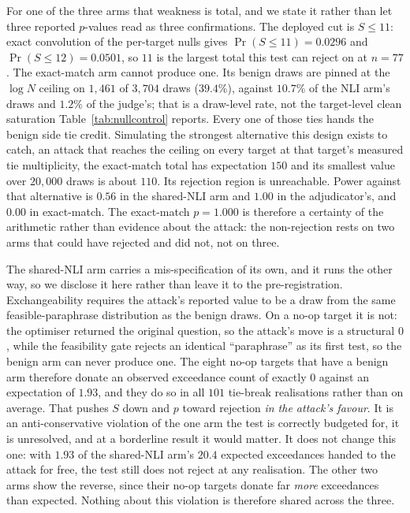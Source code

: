 For one of the three arms that weakness is total, and we state it rather than let three
reported $p$-values read as three confirmations. The deployed cut is $S{\leq}11$: exact
convolution of the per-target nulls gives $\Pr(S{\leq}11) = 0.0296$ and
$\Pr(S{\leq}12) = 0.0501$, so $11$ is the largest total this test can reject on at $n{=}77$.
The exact-match arm cannot produce one. Its benign draws are pinned at the $\log N$ ceiling
on $1{,}461$ of $3{,}704$ draws ($39.4\%$), against $10.7\%$ of the NLI arm's draws and
$1.2\%$ of the judge's; that is a draw-level rate, not the target-level clean saturation
Table~\ref{tab:nullcontrol} reports. Every one of those ties hands the benign side tie
credit. Simulating the strongest
alternative this design exists to catch, an attack that reaches the ceiling on every target at
that target's measured tie multiplicity, the exact-match total has expectation $150$ and its
smallest value over $20{,}000$ draws is about $110$. Its rejection region is unreachable.
Power against that alternative is $0.56$ in the shared-NLI arm and $1.00$ in the
adjudicator's, and $0.00$ in exact-match. The exact-match $p{=}1.000$ is therefore a certainty
of the arithmetic rather than evidence about the attack: the non-rejection rests on two arms
that could have rejected and did not, not on three.

The shared-NLI arm carries a mis-specification of its own, and it runs the other way, so we disclose it
here rather than leave it to the pre-registration. Exchangeability requires the attack's
reported value to be a draw from the same feasible-paraphrase distribution as the benign
draws. On a no-op target it is not: the optimiser returned the original question, so the
attack's move is a structural $0$, while the feasibility gate rejects an identical
``paraphrase'' as its first test, so the benign arm can never produce one. The eight no-op
targets that have a benign arm therefore donate an observed exceedance count of exactly $0$
against an expectation of $1.93$, and they do so in all $101$ tie-break realisations rather than
on average. That pushes $S$ down and $p$ toward rejection \emph{in the attack's favour}. It is
an anti-conservative violation of the one arm the test is correctly budgeted for, it is
unresolved, and at a borderline result it would matter. It does not change this one: with
$1.93$ of the shared-NLI arm's $20.4$ expected exceedances handed to the attack for free, the
test still does not reject at any realisation. The other two arms show the reverse, since their
no-op targets donate far \emph{more} exceedances than expected. Nothing about this
violation is therefore shared across the three.


